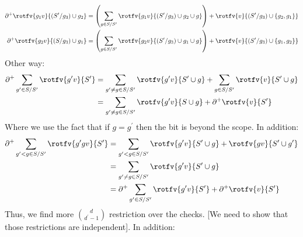 {\begin{equation*}
\begin{split}
    \end{split}
  \end{equation*}
  \begin{equation*}
    \begin{split}
      \partial^{+} \rotfv{g_{1}v}{(S^{\prime}/ g_{3}) \cup g_{2} } &= \left(\sum_{g\in S/S^{\prime}} \rotfv{g_{1}v}{(S^{\prime}/ g_{3}) \cup g_{2}   \cup g } \right) +  \rotfv{v}{(S^{\prime}/ g_{3}) \cup \{ g_{2}, g_{1} \} }  \\
    \partial^{+} \rotfv{g_{2}v}{(S / g_{3}) \cup g_{1}} &= \left( \sum_{g\in S/S^{\prime}} \rotfv{g_{2}v}{(S^{\prime}/ g_{3}) \cup g_{1}   \cup g } \right) + \rotfv{v}{(S^{\prime}/ g_{3}) \cup \{g_{1},g_{2}\} }  \\
    \end{split}
  \end{equation*}
  Other way: 
  \begin{equation*}
    \begin{split}
      \partial^{+} \sum_{g^{\prime} \in S/S^{\prime}}\rotfv{g^{\prime}v}{S^{\prime}} &= \sum_{g^{\prime} \neq g \in S/S^{\prime}}\rotfv{g^{\prime}v}{S^{\prime}\cup g} + \sum_{g \in S/S^{\prime}}\rotfv{v}{S^{\prime} \cup g} \\
      &= \sum_{g^{\prime} \neq g \in S/S^{\prime}}\rotfv{g^{\prime}v}{S\cup g} + \partial^{+}\rotfv{v}{S^{\prime}} 
    \end{split}
  \end{equation*}
  Where we use the fact that if $g = g^{\prime}$ then the bit is beyond the scope. In addition: 
  \begin{equation*}
    \begin{split}
      \partial^{+} \sum_{g^{\prime} < g \in S/S^{\prime}}\rotfv{g^{\prime}gv}{S^{\prime}} &=\sum_{g^{\prime} < g \in S/S^{\prime}}\rotfv{g^{\prime}v}{S^{\prime} \cup g} + \rotfv{gv}{S^{\prime} \cup g^{\prime}} \\
      &= \sum_{g^{\prime} \neq g \in S/S^{\prime}}\rotfv{g^{\prime}v}{S^{\prime} \cup g} \\
      &=  \partial^{+} \sum_{g^{\prime} \in S/S^{\prime}}\rotfv{g^{\prime}v}{S^{\prime}} + \partial^{+}\rotfv{v}{S^{\prime}} 
    \end{split}
  \end{equation*}
  Thus, we find more ${ d \choose d^{\prime} - 1 }$ restriction over the checks. [We need to show that those restrictions are independent]. In addition:
  \begin{equation*}
    \begin{split}

\end{split}
\end{equation*}}
